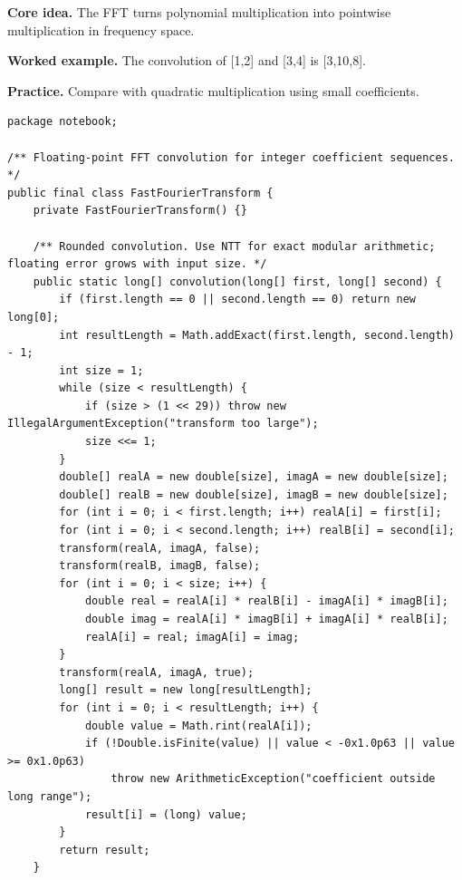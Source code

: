 \documentclass[10pt,letterpaper]{article}
\begin{document}
\noindent\textbf{Core idea.} The FFT turns polynomial multiplication into pointwise multiplication in frequency space.\par
\noindent\textbf{Worked example.} The convolution of [1,2] and [3,4] is [3,10,8].\par
\noindent\textbf{Practice.} Compare with quadratic multiplication using small coefficients.\par
\begin{lstlisting}
package notebook;

/** Floating-point FFT convolution for integer coefficient sequences. */
public final class FastFourierTransform {
    private FastFourierTransform() {}

    /** Rounded convolution. Use NTT for exact modular arithmetic; floating error grows with input size. */
    public static long[] convolution(long[] first, long[] second) {
        if (first.length == 0 || second.length == 0) return new long[0];
        int resultLength = Math.addExact(first.length, second.length) - 1;
        int size = 1;
        while (size < resultLength) {
            if (size > (1 << 29)) throw new IllegalArgumentException("transform too large");
            size <<= 1;
        }
        double[] realA = new double[size], imagA = new double[size];
        double[] realB = new double[size], imagB = new double[size];
        for (int i = 0; i < first.length; i++) realA[i] = first[i];
        for (int i = 0; i < second.length; i++) realB[i] = second[i];
        transform(realA, imagA, false);
        transform(realB, imagB, false);
        for (int i = 0; i < size; i++) {
            double real = realA[i] * realB[i] - imagA[i] * imagB[i];
            double imag = realA[i] * imagB[i] + imagA[i] * realB[i];
            realA[i] = real; imagA[i] = imag;
        }
        transform(realA, imagA, true);
        long[] result = new long[resultLength];
        for (int i = 0; i < resultLength; i++) {
            double value = Math.rint(realA[i]);
            if (!Double.isFinite(value) || value < -0x1.0p63 || value >= 0x1.0p63)
                throw new ArithmeticException("coefficient outside long range");
            result[i] = (long) value;
        }
        return result;
    }


\end{lstlisting}
\end{document}
